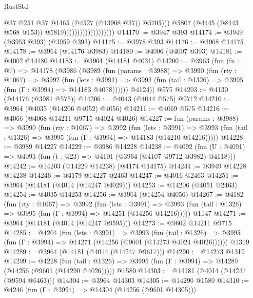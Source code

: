 \begin{lexlean}{RustStd}
\begin{coremodule}
                                                @37
                                                @251
                                                @37
                                                @1465
                                                (@4527 (@13908 @37))
                                                @5705)))
                                          @5807
                                          (@4445 (@8143 @568 @153))
                                          @5819)))))))))))))))))))
@14170 := @3947 @393
@14174 := @3949 (@3953 @393) (@3959 @393)
@14175 := @3978 @393
@14176 := @3968 @14175
@14178 := @3964 (@14176 @3983)
@14180 := @4006 (@4007 @393)
@14181 := @4002 @14180
@14183 := @3964 (@14181 @4031)
@14200 := @3963
    (fun (fn : @7) =>
    @14178
      (@3986
        (@3989
          (fun (params : @3988) =>
          @3990
            (fun (rty : @1067) =>
            @3992
              (fun (lets : @3991) =>
              @3993 (fun (tail : @1326) => @3995 (fun (Γ : @3994) => @14183 @4078))))))
        @4124))
    @575
@14203 := @4130 (@14176 (@3981 @575))
@14206 := @4043 (@4044 @575) @9712
@14210 := @3964 (@4035 (@14206 @4052) @4056)
@14211 := @4069 @575
@14216 := @4066 (@4068 @14211 @9715 @4024 @4026)
@14227 := fun (params : @3988) =>
  @3990
    (fun (rty : @1067) =>
    @3992
      (fun (lets : @3991) =>
      @3993 (fun (tail : @1326) => @3995 (fun (Γ : @3994) => @14183 (@14210 @14216)))))
@14228 := @3989 @14227
@14229 := @3986 @14228
@14238 := @4092
    (fun (U : @4091) => @4093 (fun (t : @23) => @4101 (@3964 (@4107 @9712 @3982) @4118)))
@14242 := @14203 (@14229 @14238) (@4174 @14175)
@14244 := @3949 @14228 @14238
@14246 := @4179 @14227 @2463
@14247 := @4016 @2463
@14251 := @3964 (@14181 (@4014 (@14247 @4029)))
@14253 := @14206 (@4051 @2463)
@14254 := @4035 @14253
@14256 := @3964 (@14254 @4056)
@14267 := @4182
    (fun (rty : @1067) =>
    @3992
      (fun (lets : @3991) =>
      @3993 (fun (tail : @1326) => @3995 (fun (Γ : @3994) => @14251 (@14256 @14216)))))
    @1147
@14271 := @3964 (@14181 (@4014 (@14247 @9595)))
@14273 := @9602 @14211 @9715
@14285 := @4204
    (fun (lets : @3991) =>
    @3993
      (fun (tail : @1326) =>
      @3995 (fun (Γ : @3994) => @14271 (@14256 (@9601 (@14273 @4024 @4026))))))
    @1319
@14289 := @3964 (@14181 (@4014 (@14247 @9617)))
@14290 := @14273 @1319
@14299 := @4228
    (fun (tail : @1326) => @3995 (fun (Γ : @3994) => @14289 (@14256 (@9601 (@14290 @4026)))))
    @1580
@14303 := @14181 (@4014 (@14247 (@9594 @6463)))
@14304 := @3964 @14303
@14305 := @14290 @1580
@14310 := @4246 (fun (Γ : @3994) => @14304 (@14256 (@9601 @14305)))

\end{coremodule}
\end{lexlean}
